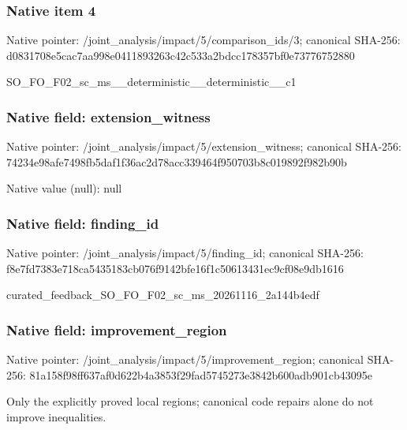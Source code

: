 \documentclass[10pt,a4paper]{article}
\begin{document}
\subsubsection{Native item 4}
Native pointer: /joint\_\allowbreak{}analysis/impact/5/comparison\_\allowbreak{}ids/3; canonical SHA-256: d0831708e5cac7aa998e0411893263c42c533a2bdcc178357bf0e73776752880

\begingroup\raggedright\sloppy SO\_\allowbreak{}FO\_\allowbreak{}F02\_\allowbreak{}sc\_\allowbreak{}ms\_\allowbreak{}\_\allowbreak{}deterministic\_\allowbreak{}\_\allowbreak{}deterministic\_\allowbreak{}\_\allowbreak{}c1\par\endgroup

\subsubsection{Native field: extension\_\allowbreak{}witness}
Native pointer: /joint\_\allowbreak{}analysis/impact/5/extension\_\allowbreak{}witness; canonical SHA-256: 74234e98afe7498fb5daf1f36ac2d78acc339464f950703b8c019892f982b90b

Native value (null): null

\subsubsection{Native field: finding\_\allowbreak{}id}
Native pointer: /joint\_\allowbreak{}analysis/impact/5/finding\_\allowbreak{}id; canonical SHA-256: f8e7fd7383e718ca5435183cb076f9142bfe16f1c50613431ec9cf08e9db1616

\begingroup\raggedright\sloppy curated\_\allowbreak{}feedback\_\allowbreak{}SO\_\allowbreak{}FO\_\allowbreak{}F02\_\allowbreak{}sc\_\allowbreak{}ms\_\allowbreak{}20261116\_\allowbreak{}2a144b4edf\par\endgroup

\subsubsection{Native field: improvement\_\allowbreak{}region}
Native pointer: /joint\_\allowbreak{}analysis/impact/5/improvement\_\allowbreak{}region; canonical SHA-256: 81a158f98ff637af0d622b4a3853f29fad5745273e3842b600adb901cb43095e

\begingroup\raggedright\sloppy Only the explicitly proved local regions;\allowbreak{} canonical code repairs alone do not improve inequalities.\par\endgroup
\end{document}
